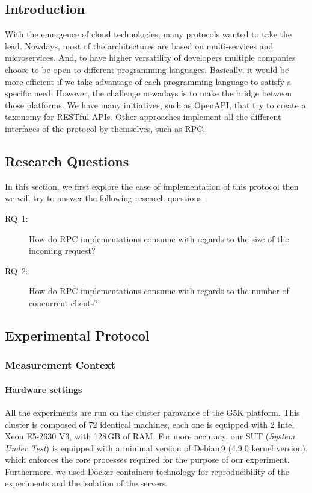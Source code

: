 \subsection{Introduction}
With the emergence of cloud technologies, many protocols wanted to take the lead.
Nowdays, most of the architectures are based on multi-services and microservices.
And, to have higher versatility of developers multiple companies choose to be open to different programming languages.
Basically, it would be more efficient if we take advantage of each programming language to satisfy a specific need.
However, the challenge nowadays is to make the bridge between those platforms.
We have many initiatives, such as OpenAPI, that try to create a taxonomy for RESTful APIs.
Other approaches implement all the different interfaces of the protocol by themselves, such as RPC.

\subsection{Research Questions}
In this section, we first explore the ease of implementation of this protocol then we will try to answer the following research questions:
\begin{description}
    \item[\textsc{RQ}~1:] How do RPC implementations consume with regards to the size of the incoming request?
    \item[\textsc{RQ}~2:] How do RPC implementations consume with regards to the number of concurrent clients?
\end{description}

\subsection{Experimental Protocol}
\subsubsection{Measurement Context}
\paragraph{Hardware settings}
All the experiments are run on the cluster \textsf{paravance} of the G5K platform.
This cluster is composed of 72 identical machines, each one is equipped with 2 Intel Xeon E5-2630 V3, with 128\,GB of RAM.
For more accuracy, our SUT (\emph{System Under Test}) is equipped with a minimal version of Debian\,9 (4.9.0 kernel version), which enforces the core processes required for the purpose of our experiment.
Furthermore, we used Docker containers technology for reproducibility of the experiments and the isolation of the servers.
